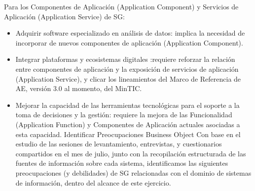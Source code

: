\documentclass[
	a4paper, %
	12pt, %
]{include/CSSullivanBusinessReport}
\def\tightlist{}
\begin{document}
Para los Componentes de Aplicación (Application Component) y Servicios
de Aplicación (Application Service) de SG:

\begin{itemize}
\tightlist
\item
  Adquirir software especializado en análisis de datos: implica la
  necesidad de incorporar de nuevos componentes de aplicación
  (Application Component).
\item
  Integrar plataformas y ecosistemas digitales :requiere reforzar la
  relación entre componentes de aplicación y la exposición de servicios
  de aplicación (Application Service), y clicar los lineamientos del
  Marco de Referencia de AE, versión 3.0 al momento, del MinTIC.
\item
  Mejorar la capacidad de las herramientas tecnológicas para el soporte
  a la toma de decisiones y la gestión: requiere la mejora de las
  Funcionalidad (Application Function) y Componentes de Aplicación
  actuales asociadas a esta capacidad. \textbar{} \textbar{} Identificar
  Preocupaciones \textbar{} Business Object \textbar{} Con base en el
  estudio de las sesiones de levantamiento, entrevistas, y cuestionarios
  compartidos en el mes de julio, junto con la recopilación estructurada
  de las fuentes de información sobre cada sistema, identificamos las
  siguientes preocupaciones (y debilidades) de SG relacionadas con el
  dominio de sistemas de información, dentro del alcance de este
  ejercicio.
\end{itemize}
\end{document}
